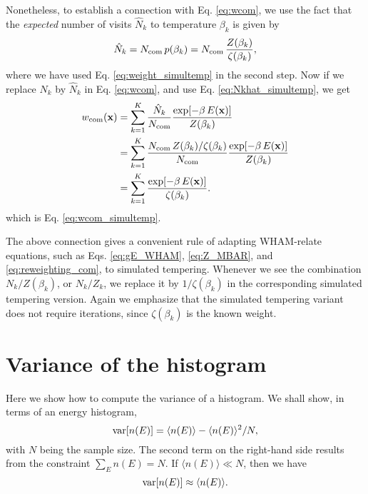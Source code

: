 \documentclass[aip,jcp,preprint,superscriptaddress]{revtex4-1}
\begin{document}
Nonetheless, to establish a connection with Eq. \eqref{eq:wcom},
we use the fact that
the \emph{expected} number of visits $\hat N_k$
to temperature $\beta_k$
is given by
\begin{equation}
  \hat N_k
  =
  N_{\mathrm{com}} \, p( \beta_k )
  =
  N_{\mathrm{com}} \, \frac{ Z(\beta_k) } { \zeta(\beta_k) },
  \label{eq:Nkhat_simultemp}
\end{equation}
where we have used
Eq. \eqref{eq:weight_simultemp}
in the second step.
%
Now if we replace $N_k$ by $\hat N_k$
in Eq. \eqref{eq:wcom},
and use Eq. \eqref{eq:Nkhat_simultemp},
we get
\begin{align*}
  w_{\mathrm{com}}(\mathbf{x})
  &=
  \sum_{k = 1}^K
  \frac{ \hat N_k } { N_{\mathrm{com}} }
  \frac{ \exp[-\beta \, E(\mathbf{x}) ] }
  { Z(\beta_k) }
  \notag \\
  &=
  \sum_{k = 1}^K
  \frac{ N_{\mathrm{com}} \, Z(\beta_k) / \zeta(\beta_k) } { N_{\mathrm{com}} }
  \frac{ \exp[-\beta \, E(\mathbf{x}) ] }
  { Z(\beta_k) }
  \notag \\
  &=
  \sum_{k = 1}^K
  \frac{ \exp[-\beta \, E(\mathbf{x}) ] }
       { \zeta(\beta_k) }.
\end{align*}
which is Eq. \eqref{eq:wcom_simultemp}.


The above connection
gives a convenient rule
of adapting WHAM-relate equations,
such as Eqs. \eqref{eq:gE_WHAM},
\eqref{eq:Z_MBAR},
and \eqref{eq:reweighting_com},
to simulated tempering.
%
Whenever we see the combination
$N_k/Z(\beta_k)$, or $N_k/Z_k$,
we replace it by
$1/\zeta(\beta_k)$
in the corresponding simulated tempering version.
%
Again we emphasize that
the simulated tempering variant
does not require iterations,
since $\zeta(\beta_k)$ is the known weight.




\appendix



\section{\label{sec:varhist}
Variance of the histogram}



Here we show how to compute
the variance of a histogram.
%
We shall show,
in terms of an energy histogram,
\begin{equation}
  \mathrm{var}[ n(E) ] = \langle n(E) \rangle -  \langle n(E) \rangle^2/N,
  \label{eq:varn}
\end{equation}
with $N$ being the sample size.
%
The second term on the right-hand side
results from the constraint $\sum_E n(E) = N$.
%
If $\langle n(E) \rangle \ll N$,
then we have
\[
  \mathrm{var}[ n(E) ] \approx \langle n(E) \rangle.
\]
\end{document}
